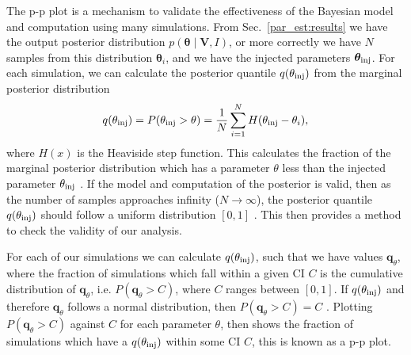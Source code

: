 The p-p plot is a mechanism to validate the effectiveness of the Bayesian model and computation using many simulations.
From Sec.~\ref{par_est:results} we have the output posterior distribution $p(\bm{\theta} \mid \bm{V}, I)$, or more correctly we have $N$ samples from this distribution $\bm{\theta}_i$, and we have the injected parameters $\bm{\theta}_{\rm{inj}}$.
For each simulation, we can calculate the posterior quantile $q(\theta_{\rm{inj}})$ from the marginal posterior distribution
\begin{equation}
    q(\theta_{\rm{inj}}) = P(\theta_{\rm{inj}} > \theta) = \frac{1}{N} \sum_{i=1}^{N} H(\theta_{\rm{inj}} - \theta_i),
\end{equation}
where $H(x)$ is the Heaviside step function. 
This calculates the fraction of the marginal posterior distribution which has a parameter $\theta$ less than the injected parameter $\theta_{\rm{inj}}$ \citep{cook2006ValidationSoftware}.
If the model and computation of the posterior is valid, then as the number of samples approaches infinity ($N \rightarrow \infty$), the posterior quantile $q(\theta_{\rm{inj}})$ should follow a uniform distribution $[0,1]$ \citep{cook2006ValidationSoftware}.
This then provides a method to check the validity of our analysis.

For each of our simulations we can calculate $q(\theta_{\rm{inj}})$, such that we have values $\bm{q}_{\theta}$, where the fraction of simulations which fall within a given \gls{CI} $C$ is the cumulative distribution of $\bm{q}_{\theta}$, i.e. $P(\bm{q}_{\theta} > C)$, where $C$ ranges between $[0,1]$.
If $q(\theta_{\rm{inj}})$ and therefore $\bm{q}_{\theta}$ follows a normal distribution, then $P(\bm{q}_{\theta} > C) = C$ \citep{cook2006ValidationSoftware}.
Plotting $P(\bm{q}_{\theta} > C)$ against $C$ for each parameter $\theta$, then shows the fraction of simulations which have a $q(\theta_{\rm{inj}})$ within some \gls{CI} $C$, this is known as a p-p plot.

